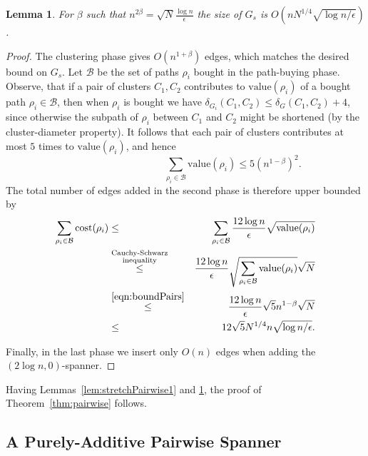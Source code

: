 \documentclass[a4paper,11pt]{article}
\newtheorem{lemma}{Lemma}[section]
\theoremstyle{definition}
\newcommand{\dist}{\delta}
\newcommand{\cost}{\mathrm{cost}}
\newcommand{\val}{\mathrm{value}}
\newcommand{\cB}{\mathcal{B}}
\begin{document}
\begin{lemma}
\label{lem:sizePairwise1}
For $\beta$ such that $n^{2\beta} = \sqrt{N} \frac{\log n}{\epsilon}$ the 
size of $G_s$ is $O(nN^{1/4}\sqrt{\log n / \epsilon})$.
\end{lemma}

\begin{proof}
The clustering phase gives $O(n^{1+\beta})$ edges, which matches the desired bound on $G_s$.
Let $\cB$ be the set of paths $\rho_i$ bought in the path-buying phase.
Observe, that if a pair of clusters $C_1,C_2$ contributes to $\val(\rho_i)$ of a bought path $\rho_i \in \cB$,
then when $\rho_i$ is bought we have $\dist_{G_i}(C_1,C_2) \le \dist_G(C_1,C_2)+4$, since otherwise
the subpath of $\rho_i$ between $C_1$ and $C_2$ might be shortened (by the cluster-diameter property). It follows that each pair of clusters contributes at most $5$ times to $\val(\rho_i)$, and hence 
\begin{equation}
\hspace{4cm}\sum_{\rho_i \in \cB}\val(\rho_i)\leq 5(n^{1-\beta})^2.\label{eqn:boundPairs}
\end{equation}
The total number of edges added in the second phase is therefore upper bounded by 
\begin{eqnarray*}
\sum_{\rho_i \in \cB} \cost(\rho_i) & \le & \sum_{\rho_i \in \cB} \frac{12\log n}{\epsilon} \sqrt{\val(\rho_i)} \\
   & \overset{\substack{\text{Cauchy-Schwarz}\\\text{inequality}}}{\le} & \frac{12\log n}{\epsilon} \sqrt{\sum_{\rho_i \in \cB}\val(\rho_i)} \sqrt{N} \\
  & \overset{\eqref{eqn:boundPairs}}{\le} & \frac{12\log n}{\epsilon} \sqrt{5} n^{1-\beta} \sqrt{N} \\
  & \le & 12\sqrt{5}N^{1/4}n\sqrt{\log n / \epsilon}.
\end{eqnarray*}


Finally, in the last phase we insert only $O(n)$ edges when adding the $(2\log n,0)$-spanner.
\end{proof}

Having Lemmas~\ref{lem:stretchPairwise1} and \ref{lem:sizePairwise1}, the proof of Theorem~\ref{thm:pairwise} follows.



\subsection{A Purely-Additive Pairwise Spanner}
\label{section-pairwise-pure}
\end{document}
